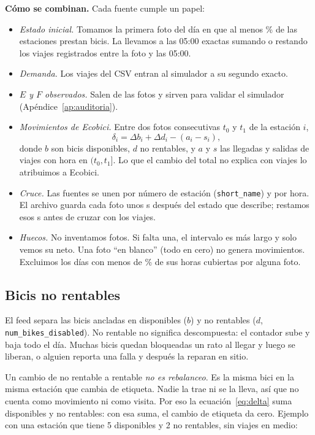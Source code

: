 \documentclass[conference,letterpaper,10pt]{IEEEtran}
\begin{document}
\textbf{Cómo se combinan.} Cada fuente cumple un papel:
\begin{itemize}
\item \emph{Estado inicial.} Tomamos la primera foto del día en que al menos \rabiertaPct\% de las estaciones prestan bicis. La llevamos a las 05:00 exactas sumando o restando los viajes registrados entre la foto y las 05:00.
\item \emph{Demanda.} Los viajes del CSV entran al simulador a su segundo exacto.
\item \emph{$E$ y $F$ observados.} Salen de las fotos y sirven para validar el simulador (Apéndice~\ref{ap:auditoria}).
\item \emph{Movimientos de Ecobici.} Entre dos fotos consecutivas $t_0$ y $t_1$ de la estación $i$,
\begin{equation}\label{eq:delta}
\delta_i=\Delta b_i+\Delta d_i-(a_i-s_i),
\end{equation}
donde $b$ son bicis disponibles, $d$ no rentables, y $a$ y $s$ las llegadas y salidas de viajes con hora en $(t_0,t_1]$. Lo que el cambio del total no explica con viajes lo atribuimos a Ecobici.
\item \emph{Cruce.} Las fuentes se unen por número de estación (\texttt{short\_name}) y por hora. El archivo guarda cada foto unos \rlagS{} s después del estado que describe; restamos esos \rlagS{} s antes de cruzar con los viajes.
\item \emph{Huecos.} No inventamos fotos. Si falta una, el intervalo es más largo y solo vemos su neto. Una foto ``en blanco'' (todo en cero) no genera movimientos. Excluimos los días con menos de \rcovMin\% de sus horas cubiertas por alguna foto.
\end{itemize}

\subsection{Bicis no rentables}\label{sec:norentables}
El feed separa las bicis ancladas en disponibles ($b$) y no rentables ($d$, \texttt{num\_bikes\_disabled}). No rentable no significa descompuesta: el contador sube y baja todo el día. Muchas bicis quedan bloqueadas un rato al llegar y luego se liberan, o alguien reporta una falla y después la reparan en sitio.

Un cambio de no rentable a rentable \emph{no es rebalanceo}. Es la misma bici en la misma estación que cambia de etiqueta. Nadie la trae ni se la lleva, así que no cuenta como movimiento ni como visita. Por eso la ecuación~\eqref{eq:delta} suma disponibles y no rentables: con esa suma, el cambio de etiqueta da cero. Ejemplo con una estación que tiene 5 disponibles y 2 no rentables, sin viajes en medio:
\end{document}
